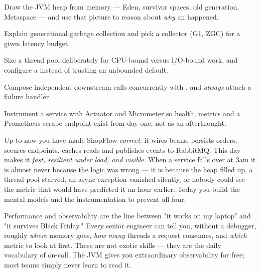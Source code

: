 
\begin{objectives}
\begin{wbitem}
  \item Draw the JVM heap from memory --- Eden, survivor spaces, old generation, Metaspace --- and use that picture to reason about \emph{why} an  happened.
  \item Explain generational garbage collection and pick a collector (G1, ZGC) for a given latency budget.
  \item Size a thread pool deliberately for CPU-bound versus I/O-bound work, and configure a  instead of trusting an unbounded default.
  \item Compose independent downstream calls concurrently with , and \emph{always} attach a failure handler.
  \item Instrument a service with Actuator and Micrometer so health, metrics and a Prometheus scrape endpoint exist from day one, not as an afterthought.
\end{wbitem}
\end{objectives}


 Up to now you have made ShopFlow \emph{correct}: it wires beans, persists orders, secures endpoints, caches reads and publishes events to RabbitMQ. This day makes it \emph{fast, resilient under load, and visible}. When a service falls over at 3am it is almost never because the logic was wrong --- it is because the heap filled up, a thread pool starved, an async exception vanished silently, or nobody could see the metric that would have predicted it an hour earlier. Today you build the mental models and the instrumentation to prevent all four.

 Performance and observability are the line between "it works on my laptop" and "it survives Black Friday." Every senior engineer can tell you, without a debugger, roughly \emph{where} memory goes, \emph{how many} threads a request consumes, and \emph{which} metric to look at first. These are not exotic skills --- they are the daily vocabulary of on-call. The JVM gives you extraordinary observability for free; most teams simply never learn to read it.

